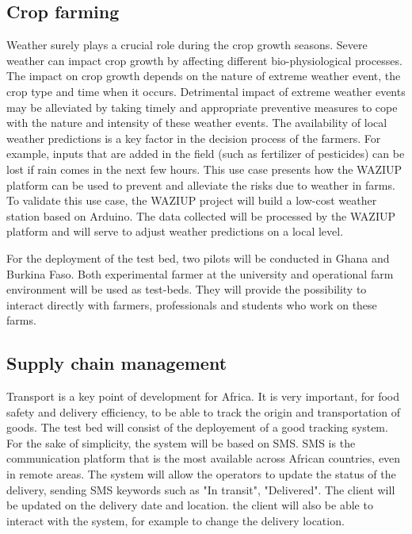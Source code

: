 \subsection{Crop farming}

Weather surely plays a crucial role during the crop growth seasons.
Severe weather can impact crop growth by affecting different bio-physiological processes.
The impact on crop growth depends on the nature of extreme weather event, the crop type and time when it occurs.
Detrimental impact of extreme weather events may be alleviated by taking timely and appropriate preventive measures to cope with the nature and intensity of these weather events.
The availability of local weather predictions is a key factor in the decision process of the farmers.
For example, inputs that are added in the field (such as fertilizer of pesticides) can be lost if rain comes in the next few hours.
This use case presents how the WAZIUP platform can be used to prevent and alleviate the risks due to weather in farms.
To validate this use case, the WAZIUP project will build a low-cost weather station based on Arduino.
The data collected will be processed by the WAZIUP platform and will serve to adjust weather predictions on a local level.

For the deployment of the test bed, two pilots will be conducted in Ghana and Burkina Faso.
Both experimental farmer at the university and operational farm environment will be used as test-beds.
They will provide the possibility to interact directly with farmers, professionals and students who work on these farms.

\subsection{Supply chain management}

Transport is a key point of development for Africa.
It is very important, for food safety and delivery efficiency, to be able to track the origin and transportation of goods.
The test bed will consist of the deployement of a good tracking system.
For the sake of simplicity, the system will be based on SMS.
SMS is the communication platform that is the most available across African countries, even in remote areas.
The system will allow the operators to update the status of the delivery, sending SMS keywords such as "In transit", "Delivered".
The client will be updated on the delivery date and location.
the client will also be able to interact with the system, for example to change the delivery location.


